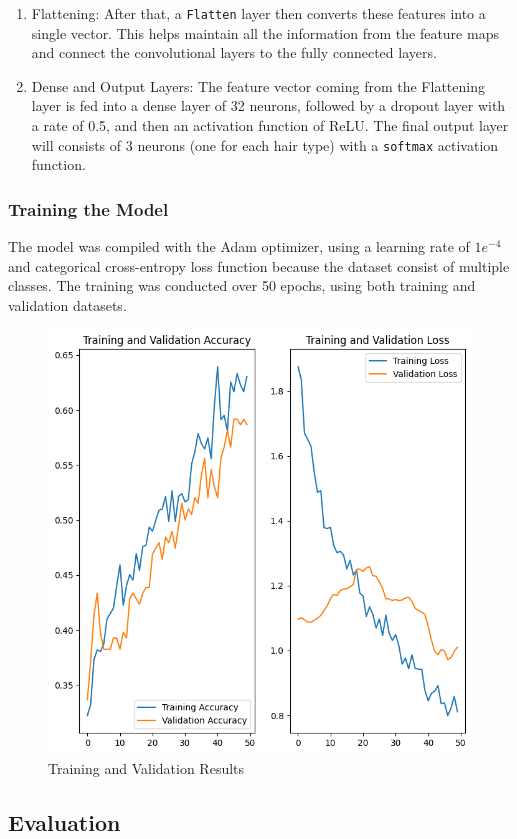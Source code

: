 \begin{enumerate}
  \item Flattening: After that, a \texttt{Flatten} layer then converts these features into a single vector. This helps maintain all the information from the feature maps and connect the convolutional layers to the fully connected layers.
  \item Dense and Output Layers: The feature vector coming from the Flattening layer is fed into a dense layer of 32 neurons, followed by a dropout layer with a rate of 0.5, and then an activation function of ReLU. The final output layer will consists of 3 neurons (one for each hair type) with a \texttt{softmax} activation function.
\end{enumerate}

\subsubsection{Training the Model}

The model was compiled with the Adam optimizer, using a learning rate of $1e^{-4}$ and categorical cross-entropy loss function because the dataset consist of multiple classes. The training was conducted over 50 epochs, using both training and validation datasets.

\begin{figure}[H]
  \centering
  \includegraphics[width=0.8\linewidth]{figures/training_validation_results.png}
  \caption{Training and Validation Results}
  \label{fig:results}
\end{figure}

\subsection{Evaluation}


